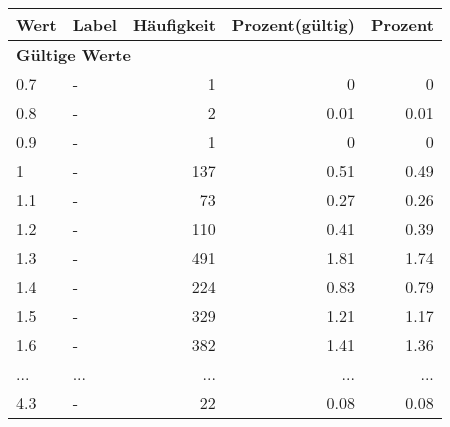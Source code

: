      \begin{longtable}{lXrrr}
     \toprule
     \textbf{Wert} & \textbf{Label} & \textbf{Häufigkeit} & \textbf{Prozent(gültig)} & \textbf{Prozent} \\
     \endhead
     \midrule
     \multicolumn{5}{l}{\textbf{Gültige Werte}}\\
        0.7 & \multicolumn{1}{X}{-} & %
          \num{1} &
          \num[round-mode=places,round-precision=2]{0} &
          \num[round-mode=places,round-precision=2]{0} \\
        0.8 & \multicolumn{1}{X}{-} & %
          \num{2} &
          \num[round-mode=places,round-precision=2]{0,01} &
          \num[round-mode=places,round-precision=2]{0,01} \\
        0.9 & \multicolumn{1}{X}{-} & %
          \num{1} &
          \num[round-mode=places,round-precision=2]{0} &
          \num[round-mode=places,round-precision=2]{0} \\
        1 & \multicolumn{1}{X}{-} & %
          \num{137} &
          \num[round-mode=places,round-precision=2]{0,51} &
          \num[round-mode=places,round-precision=2]{0,49} \\
        1.1 & \multicolumn{1}{X}{-} & %
          \num{73} &
          \num[round-mode=places,round-precision=2]{0,27} &
          \num[round-mode=places,round-precision=2]{0,26} \\
        1.2 & \multicolumn{1}{X}{-} & %
          \num{110} &
          \num[round-mode=places,round-precision=2]{0,41} &
          \num[round-mode=places,round-precision=2]{0,39} \\
        1.3 & \multicolumn{1}{X}{-} & %
          \num{491} &
          \num[round-mode=places,round-precision=2]{1,81} &
          \num[round-mode=places,round-precision=2]{1,74} \\
        1.4 & \multicolumn{1}{X}{-} & %
          \num{224} &
          \num[round-mode=places,round-precision=2]{0,83} &
          \num[round-mode=places,round-precision=2]{0,79} \\
        1.5 & \multicolumn{1}{X}{-} & %
          \num{329} &
          \num[round-mode=places,round-precision=2]{1,21} &
          \num[round-mode=places,round-precision=2]{1,17} \\
        1.6 & \multicolumn{1}{X}{-} & %
          \num{382} &
          \num[round-mode=places,round-precision=2]{1,41} &
          \num[round-mode=places,round-precision=2]{1,36} \\
       ... & ... & ... & ... & ... \\
        4.3 & \multicolumn{1}{X}{-} & %
          \num{22} &
          \num[round-mode=places,round-precision=2]{0,08} &
          \num[round-mode=places,round-precision=2]{0,08} \\


\end{longtable}
